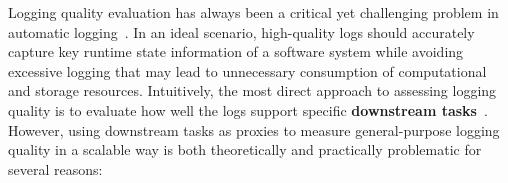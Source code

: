 
Logging quality evaluation has always been a critical yet challenging problem in automatic logging~\cite{Bogatinovski2022QuLogDA, Li2019DLFinderCA, Chen2017CharacterizingAD, Chen2021ASO, he2021survey}. In an ideal scenario, high-quality logs should accurately capture key runtime state information of a software system while avoiding excessive logging that may lead to unnecessary consumption of computational and storage resources. Intuitively, the most direct approach to assessing logging quality is to evaluate how well the logs support specific \textbf{downstream tasks}~\cite{YuanUsenixA1}. However, using downstream tasks as proxies to measure general-purpose logging quality in a scalable way is both theoretically and practically problematic for several reasons:

